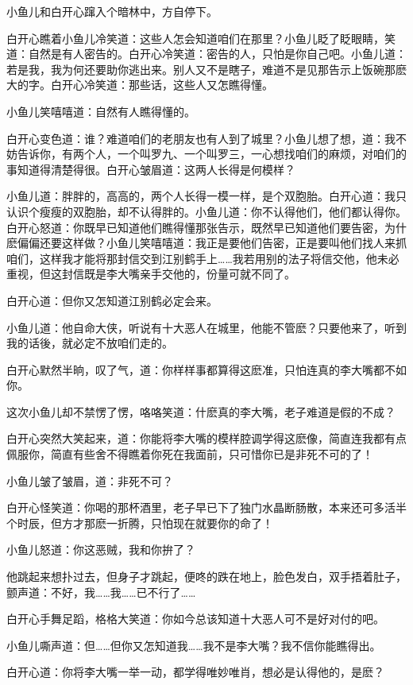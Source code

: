\documentclass[12pt,oneside]{book}
\begin{document}
小鱼儿和白开心蹿入个暗林中，方自停下。

白开心瞧着小鱼儿冷笑道：这些人怎会知道咱们在那里？小鱼儿眨了眨眼睛，笑道：自然是有人密告的。白开心冷笑道：密告的人，只怕是你自己吧。小鱼儿道：若是我，我为何还要助你逃出来。别人又不是瞎子，难道不是见那告示上饭碗那麽大的字。白开心冷笑道：那些话，这些人又怎瞧得懂。

小鱼儿笑嘻嘻道：自然有人瞧得懂的。

白开心变色道：谁？难道咱们的老朋友也有人到了城里？小鱼儿想了想，道：我不妨告诉你，有两个人，一个叫罗九、一个叫罗三，一心想找咱们的麻烦，对咱们的事知道得清楚得很。白开心皱眉道：这两人长得是何模样？

小鱼儿道：胖胖的，高高的，两个人长得一模一样，是个双胞胎。白开心道：我只认识个瘦瘦的双胞胎，却不认得胖的。小鱼儿道：你不认得他们，他们都认得你。白开心怒道：你既早已知道他们瞧得懂那张告示，既然早已知道他们要告密，为什麽偏偏还要这样做？小鱼儿笑嘻嘻道：我正是要他们告密，正是要叫他们找人来抓咱们，这样我才能将那封信交到江别鹤手上\ldots\ldots 我若用别的法子将信交他，他未必重视，但这封信既是李大嘴亲手交他的，份量可就不同了。

白开心道：但你又怎知道江别鹤必定会来。

小鱼儿道：他自命大侠，听说有十大恶人在城里，他能不管麽？只要他来了，听到我的话後，就必定不放咱们走的。

白开心默然半晌，叹了气，道：你样样事都算得这麽准，只怕连真的李大嘴都不如你。

这次小鱼儿却不禁愣了愣，咯咯笑道：什麽真的李大嘴，老子难道是假的不成？

白开心突然大笑起来，道：你能将李大嘴的模样腔调学得这麽像，简直连我都有点佩服你，简直有些舍不得瞧着你死在我面前，只可惜你已是非死不可的了！

小鱼儿皱了皱眉，道：非死不可？

白开心怪笑道：你喝的那杯酒里，老子早已下了独门水晶断肠散，本来还可多活半个时辰，但方才那麽一折腾，只怕现在就要你的命了！

小鱼儿怒道：你这恶贼，我和你拚了？

他跳起来想扑过去，但身子才跳起，便咚的跌在地上，脸色发白，双手捂着肚子，颤声道：不好，我\ldots\ldots 我\ldots\ldots 已不行了\ldots\ldots{}

白开心手舞足蹈，格格大笑道：你如今总该知道十大恶人可不是好对付的吧。

小鱼儿嘶声道：但\ldots\ldots 但你又怎知道我\ldots\ldots 我不是李大嘴？我不信你能瞧得出。

白开心道：你将李大嘴一举一动，都学得唯妙唯肖，想必是认得他的，是麽？
\end{document}
